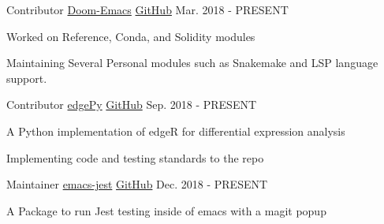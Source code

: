 

\begin{cventries}

  \cventry
    {Contributor} %
    {\href{https://github.com/hlissner/doom-emacs}{Doom-Emacs}} %
    {\href{https://github.com/hlissner/doom-emacs}{GitHub}} %
    {Mar. 2018 - PRESENT} %
    {
      \begin{cvitems} %
        \item {Worked on Reference, Conda, and Solidity modules}
        \item {Maintaining Several Personal modules such as Snakemake and LSP language support.}
      \end{cvitems}
    }

  \cventry
    {Contributor} %
    {\href{https://github.com/r-bioinformatics/edgePy}{edgePy}} %
    {\href{https://github.com/r-bioinformatics/edgePy}{GitHub}} %
    {Sep. 2018 - PRESENT} %
    {
      \begin{cvitems} %
        \item {A Python implementation of edgeR for differential expression analysis}
        \item {Implementing code and testing standards to the repo}
      \end{cvitems}
    }

  \cventry
    {Maintainer} %
    {\href{https://github.com/emiller88/emacs-jest}{emacs-jest}} %
    {\href{https://github.com/emiller88/emacs-jest}{GitHub}} %
    {Dec. 2018 - PRESENT} %
    {
      \begin{cvitems} %
        \item {A Package to run Jest testing inside of emacs with a magit popup}
      \end{cvitems}
    }

\end{cventries}
